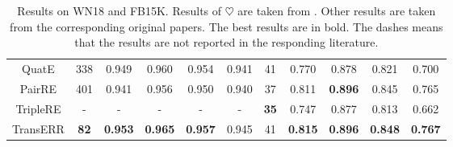 \documentclass[11pt]{article}
\begin{document}
\begin{table}[htb]
{\begin{tabular}{ccccccccccc}
			QuatE              & 338                               & 0.949                              & 0.960          & 0.954          & 0.941          & 41          & 0.770          & 0.878          & 0.821          & 0.700          \\
			PairRE             & 401                                 & 0.941                                  & 0.956              & 0.950              & 0.940              & 37 & 0.811          & \textbf{0.896} & 0.845          & 0.765          \\ 
			TripleRE   & -                                     & -                                   & -              & -              & -              & \textbf{35}   & 0.747          & 0.877          & 0.813          & 0.662          \\ \hline
			
			TransERR            & \textbf{82}                       & \textbf{0.953}                     & \textbf{0.965} & \textbf{0.957} & 0.945          & 41          & \textbf{0.815} & \textbf{0.896} & \textbf{0.848} & \textbf{0.767} \\ \hline
		\end{tabular}}
		\caption{Results on WN18 and FB15K. Results of $\heartsuit $ are taken from \citet{31sun2019rotate}.  Other results are taken from the corresponding original papers. The best results are in bold. The dashes means that the results are not reported in the responding literature.}
		\label{tab:wn+fb}
	\end{table}
\end{document}

